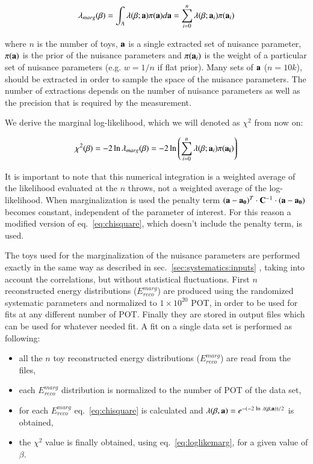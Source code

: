 \begin{equation}
\lambda_{marg} (\beta) = \int_{A} \lambda (\beta;{\bf a}) \pi{({\bf a})} d {\bf a} = \sum_{i=0}^{n} \lambda (\beta; {\bf a}_i) \pi({ {\bf a}_i})  
\label{eq:likemarg}
\end{equation}

where $n$ is the number of toys, ${\bf a}$ is a single extracted set of nuisance parameter, $\pi{({\bf a})}$ is the prior of the nuisance parameters and 
$\pi( {\bf a}_i)$ is the weight of a particular set of nuisance parameters (e.g. $w=1/n$ if flat prior).
Many sets of ${\bf a}$ ($n = 10k$), should be extracted in order to sample the space of the nuisance parameters.
The number of extractions depends on the number of nuisance parameters as well as the precision that is required by the measurement.

We derive the marginal log-likelihood, which we will denoted as $\chi^2$ from now on:

\begin{equation}
\chi^2 (\beta) = - 2  \ln \lambda_{marg} (\beta)  = -2 \ln \left( \sum_{i=0}^{n} \lambda ({\bf \beta}; {\bf a}_i) \pi({\bf a_i})  \right) 
\label{eq:loglikemarg}
\end{equation}

It is important to note that this numerical integration is a weighted average of the likelihood evaluated at the $n$ throws, 
not a weighted average of the log-likelihood.
When marginalization is used the penalty term
$ ({\bf a}-{\bf a_{0}})^{T} \cdot {\bf C}^{-1} \cdot ({\bf a}-{\bf a_{0}}) $
becomes constant, independent of the parameter of interest.
For this reason a modified version of eq.~\ref{eq:chisquare}, which doesn't include the penalty term, is used.

The toys used for the marginalization of the nuisance parameters are performed exactly in the same way as 
described in 
sec.~\ref{sec:systematics:inputs}
, taking into account the correlations, but without statistical fluctuations.
First $n$ reconstructed energy distributions ($E_{reco}^{marg}$) are produced using the randomized systematic parameters
and normalized to $1 \times 10^{20}$ POT, in order to be used for fits at any different number of POT. 
Finally they are stored in output files which can be used for whatever needed fit.
A fit on a single data set is performed as following:
\begin{itemize}
\item all the $n$ toy reconstructed energy distributions ($E_{reco}^{marg}$) are read from the files,
\item each $E_{reco}^{marg}$ distribution is normalized to the number of POT of the data set,
\item for each $E_{reco}^{marg}$ eq.~\ref{eq:chisquare} is calculated and $\lambda(\beta,{\bf a}) = e^{- (-2 \; \textrm{ln} \; \lambda (\beta,{\bf a})) / 2}$ is obtained,
\item the $\chi^2$ value is finally obtained, using eq.~\ref{eq:loglikemarg}, for a given value of $\beta$. 
\end{itemize}


